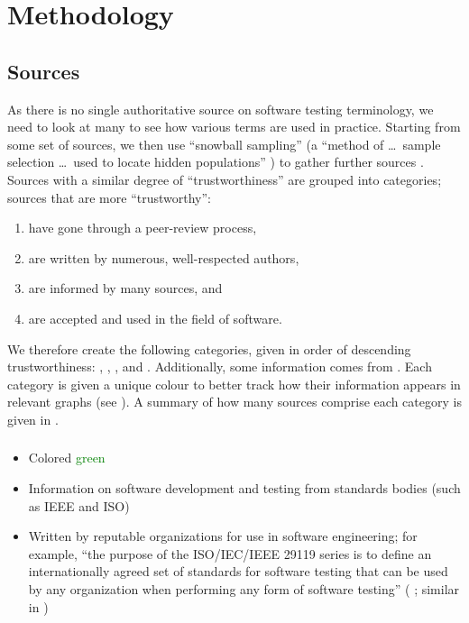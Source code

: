 \section{Methodology}
\label{methodology}

\subsection{Sources}
\label{sources}
As there is no single authoritative source on software testing terminology,
we need to look at many to see how various terms are used in practice.
Starting from some set of sources, we then use
``snowball sampling'' (a ``method of \dots\ sample selection \dots\ used to
locate hidden populations'' \citep{Johnson2014}) to gather further sources%
. Sources with a similar degree of
``trustworthiness'' are grouped into categories; sources that are more
``trustworthy'':
\begin{enumerate}
    \item have gone through a peer-review process,
    \item are written by numerous, well-respected authors,
    \item are informed by many sources, and
    \item are accepted and used in the field of software.
\end{enumerate}

We therefore create the following categories, given in order of descending
trustworthiness: \stds{}, \metas{}, \texts{}, and \papers{}. \ifnotpaper
    Additionally, some information comes from . \fi Each category is
given a unique colour to better track how their information appears in relevant
graphs (see ). A summary
of how many sources comprise each category is given in .

\subsubsection{}
\label{stds}
\begin{itemize}
    \item Colored \textcolor{green}{green}
    \item Information on software development and testing from
          standards bodies \ifnotpaper\else (such as IEEE and ISO)\fi
    \item Written by reputable organizations for use in software engineering;
          for example, ``the purpose of the ISO/IEC/IEEE 29119 series is to
          define an internationally agreed set of standards for software
          testing that can be used by any organization when performing any form
          of software testing'' \ifnotpaper(\fi\citealp[p.~vii]{IEEE2022}%
          \ifnotpaper; similar in \citeyear[p.~ix]{IEEE2016})\fi
\end{itemize}

